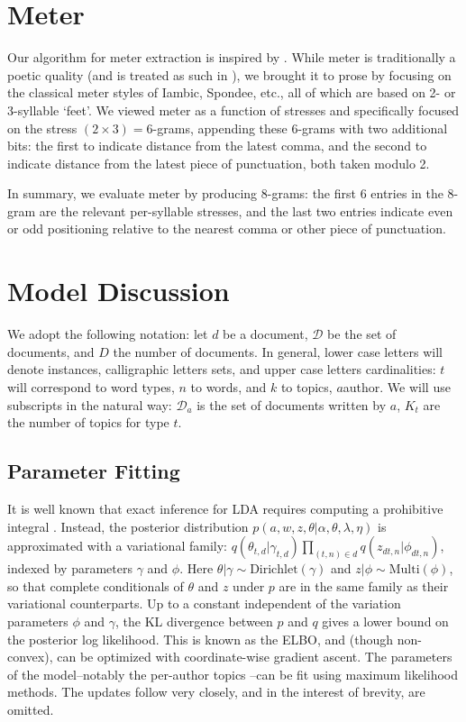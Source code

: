 \documentclass[14pt]{article} %
\theoremstyle{plain}
\theoremstyle{definition}
\theoremstyle{remark}
\begin{document}
\begin{appendix}


\section{Meter}
\label{appendix:meter}

Our algorithm for meter extraction is inspired by \citet{Genzel}. While meter is traditionally a poetic quality (and is treated as such in \citep{Genzel}), we brought it to prose by focusing on the classical meter styles of Iambic, Spondee, etc., all of which are based on 2- or 3-syllable `feet'. We viewed meter as a function of stresses and specifically focused on the stress $(2\times3)=6$-grams, appending these $6$-grams with two additional bits: the first to indicate distance from the latest comma, and the second to indicate distance from the latest piece of punctuation, both taken modulo 2.

In summary, we evaluate meter by producing $8$-grams: the first $6$ entries in the $8$-gram are the relevant per-syllable stresses, and the last two entries indicate even or odd positioning relative to the nearest comma or other piece of punctuation.

\section{Model Discussion}
\label{appendix:model}

We adopt the following notation: let $d$ be a document, $\mathcal{D}$ be the set of documents, and $D$ the number of documents. In general, lower case letters will denote instances, calligraphic letters sets, and upper case letters cardinalities: $t$ will correspond to word types, $n$ to words, and $k$ to topics, $a$author. We will use subscripts in the natural way: $\mathcal{D}_a$ is the set of documents written by $a$, $K_t$ are the number of topics for type $t$.

\subsection{Parameter Fitting}
\label{appendix:parameter_fitting}

It is well known that exact inference for LDA requires computing a prohibitive integral \cite{Blei2003}. Instead, the posterior distribution $p(a,w,z,\theta|\alpha,\theta,\lambda,\eta)$ is approximated with a variational family: $q(\theta_{t,d}|\gamma_{t,d})\prod_{(t,n)\in d}q(z_{dt,n}|\phi_{dt,n})$, indexed by parameters $\gamma$ and $\phi$. Here $\theta|\gamma \sim\text{Dirichlet}(\gamma)$ and $z|\phi \sim\text{Multi}(\phi)$, so that complete conditionals of $\theta$ and $z$ under $p$ are in the same family as their variational counterparts. Up to a constant independent of the variation parameters $\phi$ and $\gamma$, the KL divergence between $p$ and $q$ gives a lower bound on the posterior log likelihood. This is known as the ELBO, and (though non-convex), can be optimized with coordinate-wise gradient ascent. The parameters of the model--notably the per-author topics --can be fit using maximum likelihood methods. The updates follow \cite{wang2009simultaneous} very closely, and in the interest of brevity, are omitted.


\end{appendix}
\end{document}
